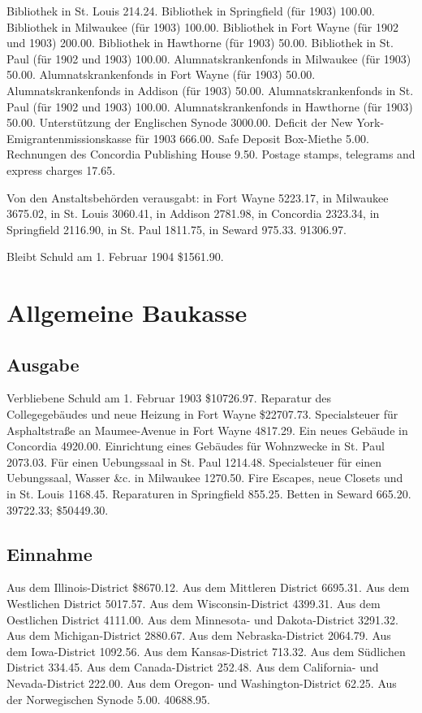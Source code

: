 Bibliothek in St. Louis 214.24. Bibliothek in Springfield (für 1903) 100.00. Bibliothek in Milwaukee (für 1903) 100.00. Bibliothek in Fort Wayne (für 1902 und 1903) 200.00. Bibliothek in Hawthorne (für 1903) 50.00. Bibliothek in St. Paul (für 1902 und 1903) 100.00. Alumnatskrankenfonds in Milwaukee (für 1903) 50.00. Alumnatskrankenfonds in Fort Wayne (für 1903) 50.00. Alumnatskrankenfonds in Addison (für 1903) 50.00. Alumnatskrankenfonds in St. Paul (für 1902 und 1903) 100.00. Alumnatskrankenfonds in Hawthorne (für 1903) 50.00. Unterstützung der Englischen Synode 3000.00. Deficit der New York-Emigrantenmissionskasse für 1903 666.00. Safe Deposit Box-Miethe 5.00. Rechnungen des Concordia Publishing House 9.50. Postage stamps, telegrams and express charges 17.65.

Von den Anstaltsbehörden verausgabt: in Fort Wayne 5223.17, in Milwaukee 3675.02, in St. Louis 3060.41, in Addison 2781.98, in Concordia 2323.34, in Springfield 2116.90, in St. Paul 1811.75, in Seward 975.33. 91306.97.

Bleibt Schuld am 1. Februar 1904 \$1561.90.

\section{Allgemeine Baukasse}

\subsection{Ausgabe}

Verbliebene Schuld am 1. Februar 1903 \$10726.97. Reparatur des Collegegebäudes und neue Heizung in Fort Wayne \$22707.73. Specialsteuer für Asphaltstraße an Maumee-Avenue in Fort Wayne 4817.29. Ein neues Gebäude in Concordia 4920.00. Einrichtung eines Gebäudes für Wohnzwecke in St. Paul 2073.03. Für einen Uebungssaal in St. Paul 1214.48. Specialsteuer für einen Uebungssaal, Wasser \&c. in Milwaukee 1270.50. Fire Escapes, neue Closets und  in St. Louis 1168.45. Reparaturen in Springfield 855.25. Betten in Seward 665.20. 39722.33; \$50449.30.

\subsection{Einnahme}

Aus dem Illinois-District \$8670.12. Aus dem Mittleren District 6695.31. Aus dem Westlichen District 5017.57. Aus dem Wisconsin-District 4399.31. Aus dem Oestlichen District 4111.00. Aus dem Minnesota- und Dakota-District 3291.32. Aus dem Michigan-District 2880.67. Aus dem Nebraska-District 2064.79. Aus dem Iowa-District 1092.56. Aus dem Kansas-District 713.32. Aus dem Südlichen District 334.45. Aus dem Canada-District 252.48. Aus dem California- und Nevada-District 222.00. Aus dem Oregon- und Washington-District 62.25. Aus der Norwegischen Synode 5.00. 40688.95.


